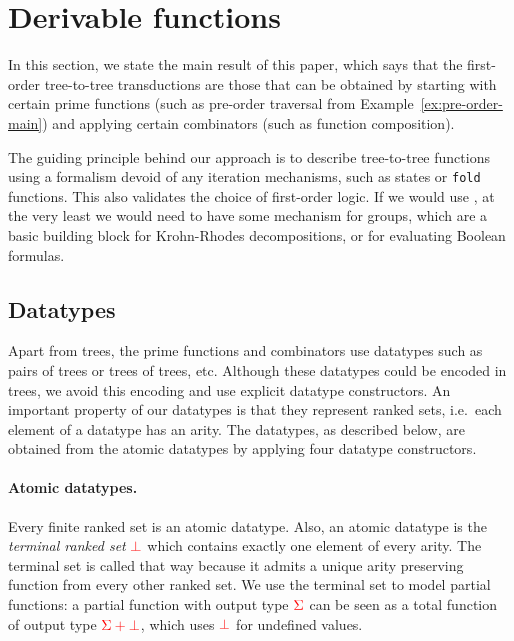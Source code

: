 \section{Derivable functions}\label{sec:derivable-functions}
In this section, we state the main result of this paper, which says that the  first-order tree-to-tree transductions are those that  can be  obtained by starting with certain prime functions (such as pre-order traversal from Example~\ref{ex:pre-order-main}) and applying certain  combinators (such as function composition). 

The guiding principle behind our approach is to describe tree-to-tree functions using a formalism devoid of any iteration mechanisms, such as states or {\tt fold} functions. This also validates the choice of first-order logic. If we would use \mso, at the very least we would need to have some mechanism for groups, which are a basic building block for Krohn-Rhodes decompositions, or for evaluating Boolean formulas. 


\subsection{Datatypes}
\label{sec:datatype-constructors}
Apart from trees, the prime functions and combinators  use  datatypes  such as pairs of trees or trees of trees, etc. Although these datatypes  could be encoded in trees, we avoid this encoding and use explicit datatype constructors. An important property of our datatypes is that they represent ranked sets, i.e.~each element of a datatype has an arity. The datatypes, as described below, are obtained from the atomic datatypes by applying four datatype constructors.

\paragraph*{Atomic datatypes.} Every finite ranked set is an atomic datatype. Also, an atomic datatype is the   \emph{terminal ranked set}  ${\color{red}{\bot}}$ which contains exactly one element of every arity.
The terminal set is called that way because it admits a unique arity preserving function from every other ranked set. 
We use the terminal set to model partial functions: a partial function with output  type  ${\color{red}{\Sigma}}$ can be seen as a total function of output type ${\color{red}{{\color{red}{\Sigma}}+ {\color{red}{\bot}}}}$, which uses  ${\color{red}{\bot}}$  for  undefined values.



